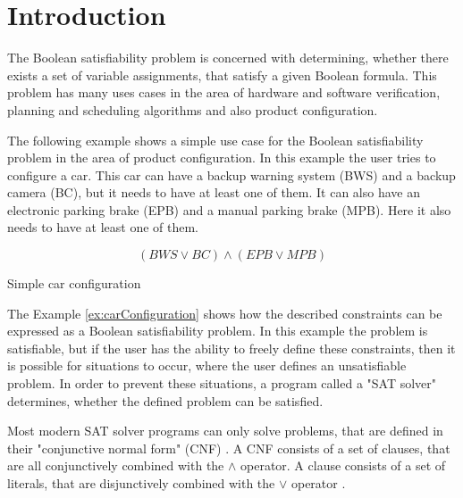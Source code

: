
\chapter{Introduction}
\label{ch:Introduction}

The Boolean satisfiability problem is concerned with determining, whether there exists a set of variable assignments, that satisfy a given Boolean formula. This problem has many uses cases in the area of hardware and software verification, planning and scheduling algorithms \cite{biere2009handbook} and also product configuration.

The following example shows a simple use case for the Boolean satisfiability problem in the area of product configuration. In this example the user tries to configure a car. This car can have a backup warning system (BWS) and a backup camera (BC), but it needs to have at least one of them. It can also have an electronic parking brake (EPB) and a manual parking brake (MPB). Here it also needs to have at least one of them.
\begin{example}
\begin{leftbar}
\begin{displaymath}
(BWS \vee BC) \wedge (EPB \vee MPB)
\end{displaymath}
\end{leftbar}
\caption{Simple car configuration}
\label{ex:carConfiguration}
\end{example}

The Example \ref{ex:carConfiguration} shows how the described constraints can be expressed as a Boolean satisfiability problem. In this example the problem is satisfiable, but if the user has the ability to freely define these constraints, then it is possible for situations to occur, where the user defines an unsatisfiable problem. In order to prevent these situations, a program called a "SAT solver" determines, whether the defined problem can be satisfied.

Most modern SAT solver programs can only solve problems, that are defined in their "conjunctive normal form" (CNF) \cite{biere2009handbook}. A CNF consists of a set of clauses, that are all conjunctively combined with the $\wedge$ operator. A clause consists of a set of literals, that are disjunctively combined with the $\vee$ operator \cite{biere2009handbook}.

